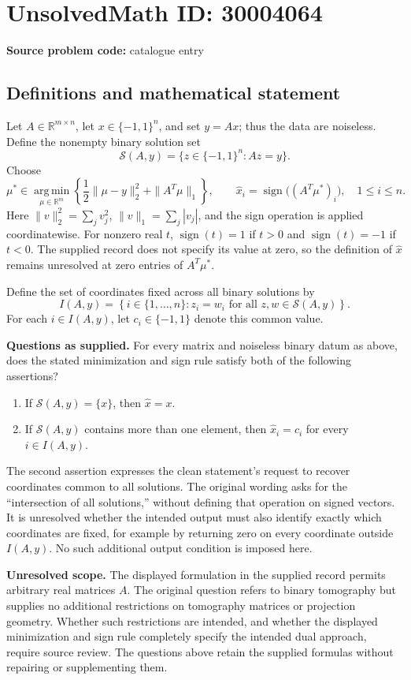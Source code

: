 \documentclass[11pt]{article}
\newcommand{\R}{\mathbb{R}}
\begin{document}
\section*{UnsolvedMath ID: 30004064}
\textbf{Source problem code:} catalogue entry
\subsection{Definitions and mathematical statement}
Let \(A\in\R^{m\times n}\), let \(x\in\{-1,1\}^n\), and set \(y=Ax\); thus the data are noiseless. Define the nonempty binary solution set
\[
\mathcal S(A,y)=\{z\in\{-1,1\}^n:Az=y\}.
\]
Choose
\[
\mu^*\in\operatorname*{arg\,min}_{\mu\in\R^m}
\left\{\frac12\|\mu-y\|_2^2+\|A^T\mu\|_1\right\},
\qquad
\widehat x_i=\operatorname{sign}\bigl((A^T\mu^*)_i\bigr),
\quad 1\leq i\leq n.
\]
Here \(\|v\|_2^2=\sum_j v_j^2\), \(\|v\|_1=\sum_j|v_j|\), and the sign operation is applied coordinatewise. For nonzero real \(t\), \(\operatorname{sign}(t)=1\) if \(t>0\) and \(\operatorname{sign}(t)=-1\) if \(t<0\). The supplied record does not specify its value at zero, so the definition of \(\widehat x\) remains unresolved at zero entries of \(A^T\mu^*\).

Define the set of coordinates fixed across all binary solutions by
\[
I(A,y)=\left\{i\in\{1,\ldots,n\}:z_i=w_i\text{ for all }z,w\in\mathcal S(A,y)\right\}.
\]
For each \(i\in I(A,y)\), let \(c_i\in\{-1,1\}\) denote this common value.

\textbf{Questions as supplied.} For every matrix and noiseless binary datum as above, does the stated minimization and sign rule satisfy both of the following assertions?
\begin{enumerate}
\item If \(\mathcal S(A,y)=\{x\}\), then \(\widehat x=x\).
\item If \(\mathcal S(A,y)\) contains more than one element, then \(\widehat x_i=c_i\) for every \(i\in I(A,y)\).
\end{enumerate}
The second assertion expresses the clean statement's request to recover coordinates common to all solutions. The original wording asks for the ``intersection of all solutions,'' without defining that operation on signed vectors. It is unresolved whether the intended output must also identify exactly which coordinates are fixed, for example by returning zero on every coordinate outside \(I(A,y)\). No such additional output condition is imposed here.

\textbf{Unresolved scope.} The displayed formulation in the supplied record permits arbitrary real matrices \(A\). The original question refers to binary tomography but supplies no additional restrictions on tomography matrices or projection geometry. Whether such restrictions are intended, and whether the displayed minimization and sign rule completely specify the intended dual approach, require source review. The questions above retain the supplied formulas without repairing or supplementing them.
\end{document}
